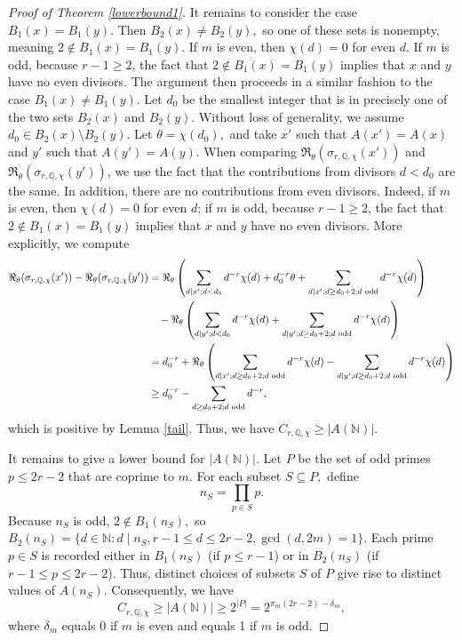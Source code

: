 \documentclass[10pt,a4paper]{amsart}
\newcommand{\N}{\mathbb{N}}
\newcommand{\Q}{\mathbb{Q}}
\begin{document}
\begin{proof}[Proof of Theorem \ref{lowerbound1}]
    It remains to consider the case $B_1(x) = B_1(y).$ Then $B_2(x) \neq B_2(y),$ so one of these sets is nonempty, meaning $2 \not\in B_1(x) = B_1(y).$ If $m$ is even, then $\chi(d) = 0$ for even $d$. If $m$ is odd, because  $r-1 \geq 2$, the fact that $2 \not\in B_1(x) = B_1(y)$ implies that $x$ and $y$ have no even divisors.  The argument then proceeds in a similar fashion to the case $B_1(x) \neq B_1(y).$ Let $d_0$ be the smallest integer that is in precisely one of the two sets $B_2(x)$ and $B_2(y).$ Without loss of generality, we assume $d_0 \in B_2(x) \setminus B_2(y).$ Let $\theta = \chi(d_0),$ and take $x'$ such that $A(x') = A(x)$ and $y'$ such that $A(y') = A(y).$ When comparing $\Re_\theta(\sigma_{r,\Q,\chi}(x'))$ and $\Re_\theta(\sigma_{r,\Q,\chi}(y'))$, we use the fact that the contributions from divisors $d < d_0$ are the same. In addition, there are no contributions from even divisors. Indeed, if $m$ is even, then $\chi(d) = 0$ for even $d$; if $m$ is odd, because  $r-1 \geq 2$, the fact that $2 \not\in B_1(x) = B_1(y)$ implies that $x$ and $y$ have no even divisors.  More explicitly, we compute 
    \begin{align*}
        \Re_\theta(\sigma_{r,\Q,\chi}(x'))-\Re_\theta(\sigma_{r,\Q,\chi}(y')) &= \Re_\theta \left( \sum_{d \mid x'; d < d_0} d^{-r} \chi(d) + d_0^{-r} \theta + \sum_{d \mid x'; d \geq d_0+2; d \text{ odd}} d^{-r}\chi(d)\right) \\
        &\text{ \; } - \Re_\theta \left( \sum_{d \mid y'; d < d_0} d^{-r} \chi(d) +  \sum_{d \mid y'; d \geq d_0+2; d \text{ odd}} d^{-r}\chi(d)\right) \\
        &= d_0^{-r} + \Re_\theta\left( \sum_{d \mid x'; d \geq d_0+2; d \text{ odd}} d^{-r}\chi(d) - \sum_{d \mid y'; d \geq d_0+2; d \text{ odd}} d^{-r}\chi(d)\right) \\
        &\geq d_0^{-r} - \sum_{d \geq d_0 + 2 ; d \text{ odd}} d^{-r},
    \end{align*}
    which is positive by Lemma \ref{tail}. Thus, we have $C_{r, \Q, \chi} \geq |A(\mathbb N)|.$ 

    It remains to give a lower bound for $|A(\N)|.$ Let $P$ be the set of odd primes $p \leq 2r-2$ that are coprime to $m$. For each subset $S \subseteq P,$ define $$n_S = \prod_{p \in S} p .$$ Because $n_S$ is odd, $2 \not\in B_1(n_S),$ so $B_2(n_S) = \{d \in \N : d \mid n_S, r-1 \leq d \leq 2r-2, \gcd(d, 2m) = 1\}.$ Each prime $p \in S$ is recorded either in $B_1(n_S)$ (if $p \leq r-1$) or in $B_2(n_S)$ (if $r-1\leq p \leq 2r-2$). Thus, distinct choices of subsets $S$ of $P$ give rise to distinct values of $A(n_S)$. Consequently, we have $$C_{r, \Q, \chi} \geq |A(\mathbb N)| \geq 2^{|P|} = 2^{\pi_m(2r-2) - \delta_m},$$ where $\delta_m$ equals 0 if $m$ is even and equals 1 if $m$ is odd.
\end{proof}
\end{document}
